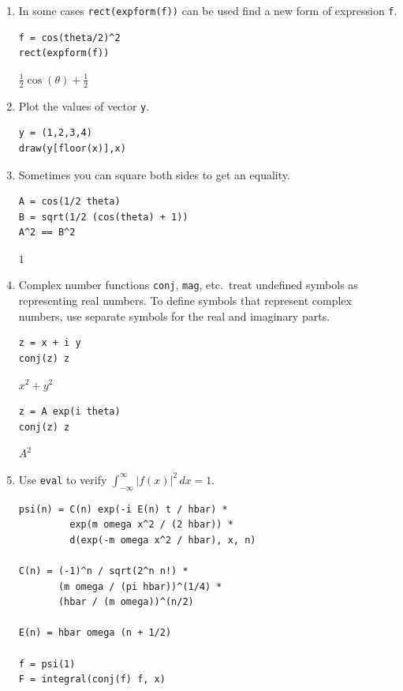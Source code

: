 \begin{enumerate}
\item
In some cases \verb$rect(expform(f))$ can be used find a new form of expression \verb$f$.

{\color{blue}
\begin{verbatim}
f = cos(theta/2)^2
rect(expform(f))
\end{verbatim}}

$\frac{1}{2}\cos(\theta)+\frac{1}{2}$

\item
Plot the values of vector \verb$y$.

{\color{blue}
\begin{verbatim}
y = (1,2,3,4)
draw(y[floor(x)],x)
\end{verbatim}}

\newpage

\item
Sometimes you can square both sides to get an equality.
{\color{blue}
\begin{verbatim}
A = cos(1/2 theta)
B = sqrt(1/2 (cos(theta) + 1))
A^2 == B^2
\end{verbatim}}

$1$

\item
Complex number functions \verb$conj$, \verb$mag$, etc.~treat undefined symbols as
representing real numbers.
To define symbols that represent complex numbers, use separate symbols for the
real and imaginary parts.

{\color{blue}
\begin{verbatim}
z = x + i y
conj(z) z
\end{verbatim}}

$x^2+y^2$

{\color{blue}
\begin{verbatim}
z = A exp(i theta)
conj(z) z
\end{verbatim}}

$A^2$

\item
Use \verb$eval$ to verify
$\int_{-\infty}^\infty|f(x)|^2\,dx=1$.

{\color{blue}
\begin{verbatim}
psi(n) = C(n) exp(-i E(n) t / hbar) *
         exp(m omega x^2 / (2 hbar)) *
         d(exp(-m omega x^2 / hbar), x, n)

C(n) = (-1)^n / sqrt(2^n n!) *
       (m omega / (pi hbar))^(1/4) *
       (hbar / (m omega))^(n/2)

E(n) = hbar omega (n + 1/2)

f = psi(1)
F = integral(conj(f) f, x)


\end{verbatim}}
\end{enumerate}
